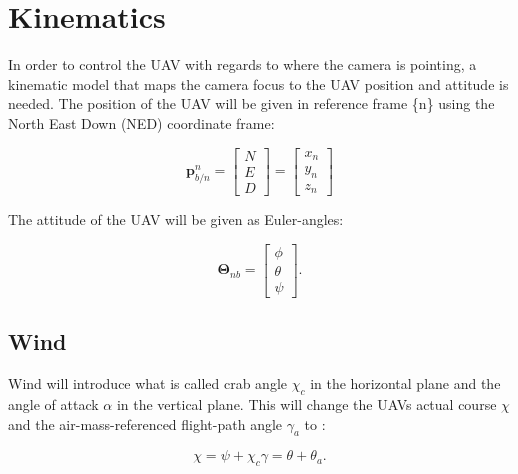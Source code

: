 \section{Kinematics}
\label{ch:kinematics}
In order to control the UAV with regards to where the camera is pointing, a kinematic model that maps the camera focus to the UAV position and attitude is needed. The position of the UAV will be given in reference frame \{n\} using the North East Down (NED) coordinate frame:

\begin{equation}
	\bm{p}_{b/n}^n =
	\begin{bmatrix}
		N \\ E \\ D
	\end{bmatrix}
	=
	\begin{bmatrix}
		x_n \\ y_n \\ z_n
	\end{bmatrix}
\end{equation}

The attitude of the UAV will be given as Euler-angles:

\begin{equation}
	\bm{\Theta}_{nb} = 
	\begin{bmatrix}
		\phi \\ \theta \\ \psi
	\end{bmatrix}.
\end{equation}
	
%
	
\subsection{Wind}
Wind will introduce what is called crab angle $\chi_c$ in the horizontal plane and the angle of attack $\alpha$ in the vertical plane. This will change the UAVs actual course $\chi$ and the air-mass-referenced flight-path angle $\gamma_a$ to \cite{suaBEARD}:

\begin{subequations}
\begin{equation}
	\chi = \psi + \chi_c
\end{equation}
\begin{equation}
	\gamma = \theta + \theta_a.
\end{equation}
\end{subequations}

